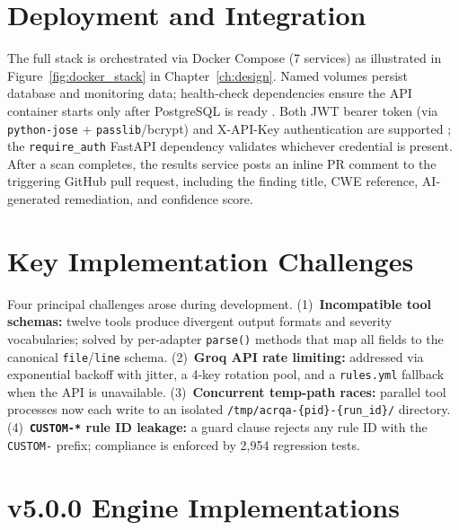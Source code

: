 \section{Deployment and Integration}
\label{sec:docker_impl}

The full stack is orchestrated via Docker Compose (7 services) as illustrated in Figure~\ref{fig:docker_stack} in Chapter~\ref{ch:design}. Named volumes persist database and monitoring data; health-check dependencies ensure the API container starts only after PostgreSQL is ready \cite{docker_security}. Both JWT bearer token (via \texttt{python-jose} + \texttt{passlib}/bcrypt) and X-API-Key authentication are supported \cite{owasp_api_top10}; the \texttt{require\_auth} FastAPI dependency validates whichever credential is present. After a scan completes, the results service posts an inline PR comment to the triggering GitHub pull request, including the finding title, CWE reference, AI-generated remediation, and confidence score.

\section{Key Implementation Challenges}
\label{sec:challenges}

Four principal challenges arose during development. (1)~\textbf{Incompatible tool schemas:} twelve tools produce divergent output formats and severity vocabularies; solved by per-adapter \texttt{parse()} methods that map all fields to the canonical \texttt{file}/\texttt{line} schema. (2)~\textbf{Groq API rate limiting:} addressed via exponential backoff with jitter, a 4-key rotation pool, and a \texttt{rules.yml} fallback when the API is unavailable. (3)~\textbf{Concurrent temp-path races:} parallel tool processes now each write to an isolated \texttt{/tmp/acrqa-\{pid\}-\{run\_id\}/} directory. (4)~\textbf{\texttt{CUSTOM-*} rule ID leakage:} a guard clause rejects any rule ID with the \texttt{CUSTOM-} prefix; compliance is enforced by 2,954 regression tests.

\section{v5.0.0 Engine Implementations}
\label{sec:v5_impl}

